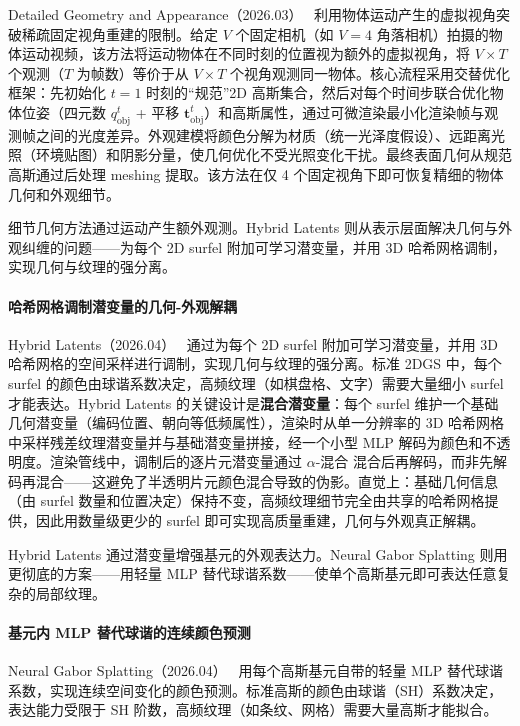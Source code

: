 Detailed Geometry and Appearance（2026.03）~\cite{2603_26665} 利用物体运动产生的虚拟视角突破稀疏固定视角重建的限制。给定 $V$ 个固定相机（如 $V{=}4$ 角落相机）拍摄的物体运动视频，该方法将运动物体在不同时刻的位置视为额外的虚拟视角，将 $V \times T$ 个观测（$T$ 为帧数）等价于从 $V \times T$ 个视角观测同一物体。核心流程采用交替优化框架：先初始化 $t{=}1$ 时刻的“规范”2D 高斯集合，然后对每个时间步联合优化物体位姿（四元数 $q_{\text{obj}}^t$ + 平移 $\mathbf{t}_{\text{obj}}^t$）和高斯属性，通过可微渲染最小化渲染帧与观测帧之间的光度差异。外观建模将颜色分解为材质（统一光泽度假设）、远距离光照（环境贴图）和阴影分量，使几何优化不受光照变化干扰。最终表面几何从规范高斯通过后处理 meshing 提取。该方法在仅 4 个固定视角下即可恢复精细的物体几何和外观细节。

细节几何方法通过运动产生额外观测。Hybrid Latents 则从表示层面解决几何与外观纠缠的问题——为每个 2D surfel 附加可学习潜变量，并用 3D 哈希网格调制，实现几何与纹理的强分离。

\paragraph{哈希网格调制潜变量的几何-外观解耦}

Hybrid Latents（2026.04）~\cite{2604_14928} 通过为每个 2D surfel 附加可学习潜变量，并用 3D 哈希网格的空间采样进行调制，实现几何与纹理的强分离。标准 2DGS 中，每个 surfel 的颜色由球谐系数决定，高频纹理（如棋盘格、文字）需要大量细小 surfel 才能表达。Hybrid Latents 的关键设计是\textbf{混合潜变量}：每个 surfel 维护一个基础几何潜变量（编码位置、朝向等低频属性），渲染时从单一分辨率的 3D 哈希网格中采样残差纹理潜变量并与基础潜变量拼接，经一个小型 MLP 解码为颜色和不透明度。渲染管线中，调制后的逐片元潜变量通过 $\alpha$-混合 混合后再解码，而非先解码再混合——这避免了半透明片元颜色混合导致的伪影。直觉上：基础几何信息（由 surfel 数量和位置决定）保持不变，高频纹理细节完全由共享的哈希网格提供，因此用数量级更少的 surfel 即可实现高质量重建，几何与外观真正解耦。

Hybrid Latents 通过潜变量增强基元的外观表达力。Neural Gabor Splatting 则用更彻底的方案——用轻量 MLP 替代球谐系数——使单个高斯基元即可表达任意复杂的局部纹理。

\paragraph{基元内 MLP 替代球谐的连续颜色预测}

Neural Gabor Splatting（2026.04）~\cite{2604_15941} 用每个高斯基元自带的轻量 MLP 替代球谐系数，实现连续空间变化的颜色预测。标准高斯的颜色由球谐（SH）系数决定，表达能力受限于 SH 阶数，高频纹理（如条纹、网格）需要大量高斯才能拟合。

